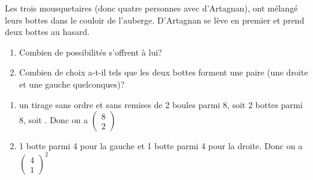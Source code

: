 \documentclass{book}
\begin{document}
\begin{Exercice}[Mousquetaires]
Les trois mousquetaires (donc quatre personnes avec d'Artagnan), ont mélangé leurs bottes dans le couloir de l'auberge. D'Artagnan se lève en premier et prend deux bottes au hasard.
\begin{enumerate}
\item   Combien de possibilités s'offrent à lui?
 \item Combien de choix a-t-il tels que les deux bottes forment une paire (une droite et une gauche quelconques)?
\end{enumerate}
\begin{Correction}
\begin{enumerate}
\item  un tirage sans ordre et sans remises de 2 boules parmi 8, soit 2 bottes parmi 8, soit . Donc on a $\begin{pmatrix}
8\\2
\end{pmatrix}$
\item 1 botte parmi 4 pour la gauche et 1 botte parmi 4 pour la droite. Donc on a  $\begin{pmatrix}
4\\1
\end{pmatrix}^2$
\end{enumerate}
\end{Correction}
\end{Exercice}
\end{document}
